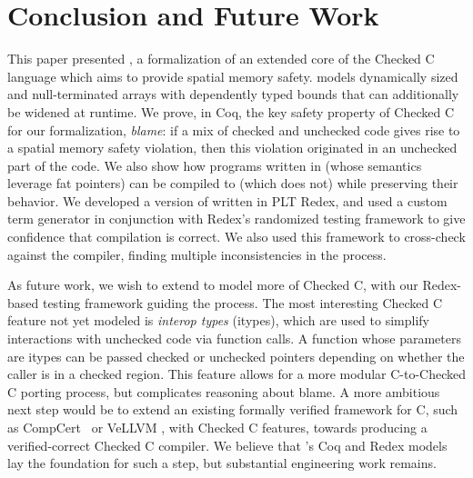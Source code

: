 \section{Conclusion and Future Work}
\label{sec:conclude}

This paper presented \CoreChkC, a formalization of an extended core of
the Checked C language which aims to provide spatial memory
safety. \CoreChkC models dynamically sized and
null-terminated arrays with dependently typed bounds that can
additionally be widened at runtime. We prove, in Coq, the key safety
property of Checked C for our formalization, {\em blame}: if a mix of
checked and unchecked code gives rise to a spatial memory safety
violation, then this violation originated in an unchecked part of the
code. We also show how programs written in \CoreChkC (whose
semantics leverage fat pointers) can be compiled to \elang (which does
not) while preserving their behavior. We developed a version of \lang
written in PLT Redex, and used a custom term generator in conjunction with Redex's
randomized testing framework to give confidence that compilation is
correct. We also used this framework to cross-check \lang
against the \checkedc compiler, finding multiple inconsistencies
in the process. 

As future work, we wish to extend \CoreChkC to model more of Checked
C, with our Redex-based testing framework guiding the process. The
most interesting Checked C feature not yet modeled is \emph{interop
  types} (itypes), which are used to simplify interactions with
unchecked code via function calls. A function whose
parameters are itypes can be passed checked or unchecked pointers
depending on whether the caller is in a checked region. This feature
allows for a more modular C-to-Checked C porting process, but complicates reasoning
about blame. A more ambitious next step would be to extend an existing
formally verified framework for C, such as CompCert~\cite{compcert} or VeLLVM
\cite{Zhao:2012:FLI:2103621.2103709}, with Checked C features, towards
producing a verified-correct Checked C compiler. We believe that
\lang's Coq and Redex models lay the foundation for such a step, but
substantial engineering work remains.
